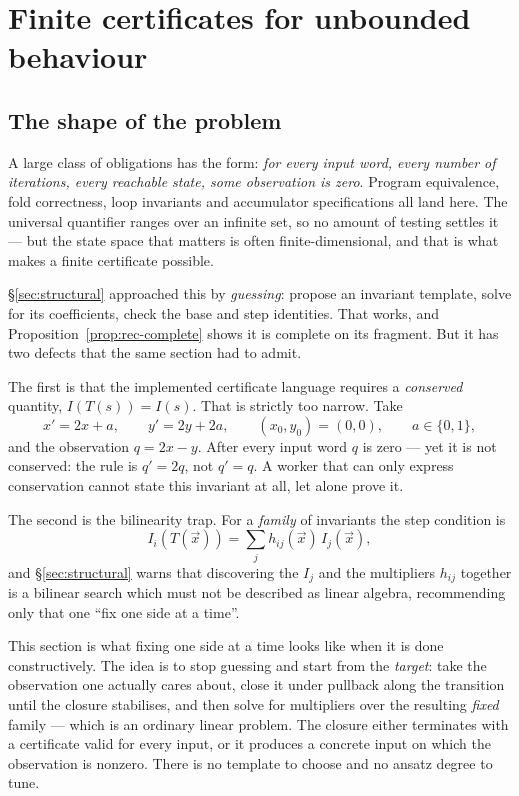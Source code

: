 \section{Finite certificates for unbounded behaviour}
\label{sec:closure}

\subsection{The shape of the problem}

A large class of obligations has the form: \emph{for every input word, every
number of iterations, every reachable state, some observation is zero}. Program
equivalence, fold correctness, loop invariants and accumulator specifications
all land here. The universal quantifier ranges over an infinite set, so no
amount of testing settles it --- but the state space that matters is often
finite-dimensional, and that is what makes a finite certificate possible.

\S\ref{sec:structural} approached this by \emph{guessing}: propose an invariant
template, solve for its coefficients, check the base and step identities. That
works, and Proposition~\ref{prop:rec-complete} shows it is complete on its
fragment. But it has two defects that the same section had to admit.

The first is that the implemented certificate language requires a
\emph{conserved} quantity, $I(T(s))=I(s)$. That is strictly too narrow. Take
\[
 x'=2x+a,\qquad y'=2y+2a,\qquad (x_0,y_0)=(0,0),\qquad a\in\{0,1\},
\]
and the observation $q=2x-y$. After every input word $q$ is zero --- yet it is
not conserved: the rule is $q'=2q$, not $q'=q$. A worker that can only express
conservation cannot state this invariant at all, let alone prove it.

The second is the bilinearity trap. For a \emph{family} of invariants the step
condition is
\[
 I_i(T(\vec x))=\sum_j h_{ij}(\vec x)\,I_j(\vec x),
\]
and \S\ref{sec:structural} warns that discovering the $I_j$ and the multipliers
$h_{ij}$ together is a bilinear search which must not be described as linear
algebra, recommending only that one ``fix one side at a time''.

This section is what fixing one side at a time looks like when it is done
constructively. The idea is to stop guessing and start from the \emph{target}:
take the observation one actually cares about, close it under pullback along
the transition until the closure stabilises, and then solve for multipliers
over the resulting \emph{fixed} family --- which is an ordinary linear problem.
The closure either terminates with a certificate valid for every input, or it
produces a concrete input on which the observation is nonzero. There is no
template to choose and no ansatz degree to tune.

